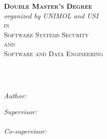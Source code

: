 \documentclass[11pt,twoside,english,singlespacing,headsepline,consistentlayout]{auxiliary/si-msc-thesis}
\author{Carmen \textsc{Armenti}} %
\theoremstyle{definition}
\begin{document}
\frontmatter
\pagestyle{plain}


%
\begin{titlepage}
    \begin{center}
    
    \vspace*{.01\textheight}
    {\scshape\LARGE \textbf \univname\par} %
    {\scshape\LARGE \deptname\par}\vspace{0.5cm} 
    \textsc{\LARGE \textbf{Double Master's Degree}}\\[0.1cm] %
    \footnotesize{\textsl{organized by UNIMOL and USI}}\\[0.5cm]
    {\textsc{in}}\\[0.5cm]
    \textsc{\LARGE Software Systems Security}\\[0.1cm]
    {\textsc{and}}\\[0.3cm]
    \textsc{\LARGE Software and Data Engineering}\\[0.5cm]
    
    \HRule \\[0.1cm] %
    {\huge \bfseries \ttitle\par}\vspace{0.4cm} %
    \HRule \\[1.2cm] %
     
    \begin{minipage}[t]{0.4\textwidth}
    \begin{flushleft} \large
    \emph{Author:}\\
    \authorname
    \end{flushleft}
    \end{minipage}
    \begin{minipage}[t]{0.4\textwidth}
    \begin{flushright} \large
    \emph{Supervisor:} \\
    \href{https://dibt.unimol.it/staff/oliveto/}{\supname}\\[0.5cm] %
    \emph{{Co-supervisor:}} \\
    \href{https://www.inf.usi.ch/faculty/bavota/#}{\cosupname}\\[0.5cm]
    \end{flushright}
    \end{minipage}\\[1.6cm]
     

\end{center}
\end{titlepage}
\end{document}

